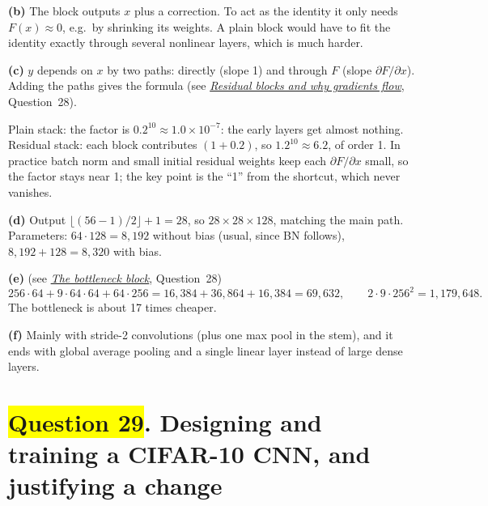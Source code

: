 \documentclass[12pt,a4paper]{article}
\newcommand{\seeconcept}[3]{(see \hyperref[#1]{\textit{#2}}, Question~#3)}
\newcommand{\hlq}[1]{{\setlength{\fboxsep}{1.5pt}\colorbox{yellow}{#1}}}
\begin{document}
\textbf{(b)} The block outputs $x$ plus a correction. To act as the identity it only needs $F(x)\approx0$, e.g.\ by shrinking its weights. A plain block would have to fit the identity exactly through several nonlinear layers, which is much harder.

\textbf{(c)} $y$ depends on $x$ by two paths: directly (slope 1) and through $F$ (slope $\partial F/\partial x$). Adding the paths gives the formula \seeconcept{c:residual}{Residual blocks and why gradients flow}{28}.

Plain stack: the factor is $0.2^{10}\approx1.0\times10^{-7}$: the early layers get almost nothing. Residual stack: each block contributes $(1+0.2)$, so $1.2^{10}\approx6.2$, of order 1. In practice batch norm and small initial residual weights keep each $\partial F/\partial x$ small, so the factor stays near 1; the key point is the ``1'' from the shortcut, which never vanishes.

\textbf{(d)} Output $\lfloor(56-1)/2\rfloor+1=28$, so $28\times28\times128$, matching the main path. Parameters: $64\cdot128=8{,}192$ without bias (usual, since BN follows), $8{,}192+128=8{,}320$ with bias.

\textbf{(e)} \seeconcept{c:bottleneck}{The bottleneck block}{28}
\[
256\cdot64+9\cdot64\cdot64+64\cdot256=16{,}384+36{,}864+16{,}384=69{,}632,\qquad 2\cdot9\cdot256^2=1{,}179{,}648 .
\]
The bottleneck is about 17 times cheaper.

\textbf{(f)} Mainly with stride-2 convolutions (plus one max pool in the stem), and it ends with global average pooling and a single linear layer instead of large dense layers.

\section[Question 29. Designing and training a CIFAR-10 CNN, and justifying a change]{\hlq{Question 29}. Designing and training a CIFAR-10 CNN, and justifying a change}
\end{document}
